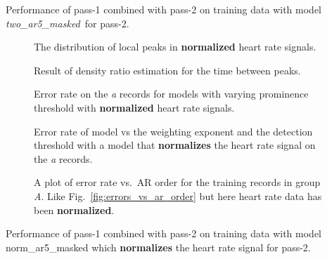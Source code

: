 \documentclass[12pt]{article}
\newcommand{\BestModel}{\emph{two\_ar5\_masked}}
\begin{document}
\begin{table*}
  \centering
  
  \caption[Performance]{Performance of pass-1 combined with pass-2 on
    training data with model
    \BestModel\ for pass-2.}
  \label{tab:score_initial}
\end{table*}


\begin{figure}
  \centering
    \caption{The distribution of local peaks in \textbf{normalized}
      heart rate signals.}
  \label{fig:norm_analyze_peaks}
\end{figure}

\begin{figure}
  \centering
    \caption{Result of density ratio estimation for the time between peaks.}
  \label{fig:norm_interval_pdfs}
\end{figure}

\begin{figure}
  \centering
    \caption{Error rate on the \emph{a} records for models with
      varying prominence threshold with \textbf{normalized} heart rate
      signals.}
  \label{fig:norm_prominence_study}
\end{figure}

\begin{figure}
  \centering
    \caption{Error rate of model vs the weighting exponent and the
      detection threshold with a model that \textbf{normalizes} the heart rate
      signal on the \emph{a} records.}
  \label{fig:norm_power_threshold}
\end{figure}

\begin{figure}
  \centering
    \caption{A plot of error rate vs.\ AR order for the training
      records in group \emph{A}.  Like Fig.~\ref{fig:errors_vs_ar_order}
      but here heart rate data has been \textbf{normalized}.}
  \label{fig:norm_errors_vs_ar_order}
\end{figure}

\begin{table*}
  \centering
  
  \caption[Performance]{Performance of pass-1 combined with pass-2 on
    training data with model norm\_ar5\_masked which \textbf{normalizes} the
    heart rate signal for pass-2.}
  \label{tab:norm_score}
\end{table*}
\end{document}

